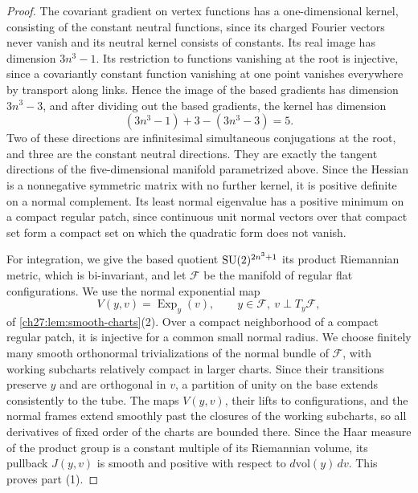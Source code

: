 \begin{proof}
The covariant gradient on vertex functions has a one-dimensional kernel, consisting of the constant neutral functions, since its charged Fourier vectors never vanish and its neutral kernel consists of constants. Its real image has dimension $3n^3-1$. Its restriction to functions vanishing at the root is injective, since a covariantly constant function vanishing at one point vanishes everywhere by transport along links. Hence the image of the based gradients has dimension $3n^3-3$, and after dividing out the based gradients, the kernel has dimension
\[
 (3n^3-1)+3-(3n^3-3)=5.
\]
Two of these directions are infinitesimal simultaneous conjugations at the root, and three are the constant neutral directions. They are exactly the tangent directions of the five-dimensional manifold parametrized above. Since the Hessian is a nonnegative symmetric matrix with no further kernel, it is positive definite on a normal complement. Its least normal eigenvalue has a positive minimum on a compact regular patch, since continuous unit normal vectors over that compact set form a compact set on which the quadratic form does not vanish.

For integration, we give the based quotient $\mathrm{SU}(2)^{2n^3+1}$ its product Riemannian metric, which is bi-invariant, and let $\mathcal F$ be the manifold of regular flat configurations. We use the normal exponential map
\[
 V(y,v)=\operatorname{Exp}_y(v),\qquad y\in\mathcal F,\ v\perp T_y\mathcal F,
\]
of \cref{ch27:lem:smooth-charts}(2). Over a compact neighborhood of a compact regular patch, it is injective for a common small normal radius. We choose finitely many smooth orthonormal trivializations of the normal bundle of $\mathcal F$, with working subcharts relatively compact in larger charts. Since their transitions preserve $y$ and are orthogonal in $v$, a partition of unity on the base extends consistently to the tube. The maps $V(y,v)$, their lifts to configurations, and the normal frames extend smoothly past the closures of the working subcharts, so all derivatives of fixed order of the charts are bounded there. Since the Haar measure of the product group is a constant multiple of its Riemannian volume, its pullback $J(y,v)$ is smooth and positive with respect to $d\mathrm{vol}(y)\,dv$. This proves part (1).


\end{proof}

